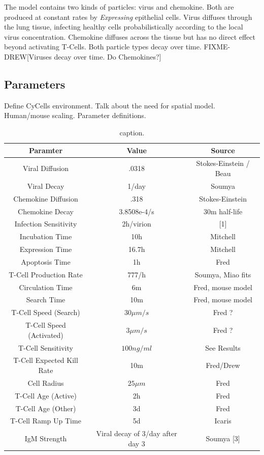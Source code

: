 \documentclass[10pt]{article}
\begin{document}
The model contains two kinds of particles: virus and chemokine. Both are produced at constant rates by \emph{Expressing} epithelial cells.
Virus diffuses through the lung tissue, infecting healthy cells probabilistically according to the local virus concentration. Chemokine diffuses across the tissue but has no
direct effect beyond activating T-Cells. Both particle types decay over time.
FIXME-DREW[Viruses decay over time. Do Chemokines?]

\subsection*{Parameters}

Define CyCells environment.  Talk about the need for spatial model.  Human/mouse scaling.  Parameter definitions. 

\begin{table}
\begin{tabular}{ | c | c | c | }
  \hline                        
  Paramter & Value & Source \\
  \hline
  Viral Diffusion & .0318 & Stokes-Einstein / Beau \\
  Viral Decay &  1/day & Soumya \\
  Chemokine Diffusion & .318 & Stokes-Einstein \\
  Chemokine Decay &  3.8508e-4/s & 30m half-life \\
  Infection Sensitivity &  2h/virion & [1] \\
  Incubation Time &  10h & Mitchell \\
  Expression Time &  16.7h & Mitchell \\
  Apoptosis Time & 1h & Fred \\
  T-Cell Production Rate & 777/h & Soumya, Miao fits \\ 
  Circulation Time & 6m & Fred, mouse model \\
  Search Time & 10m & Fred, mouse model \\
  T-Cell Speed (Search) & $30 \mu m/s$ & Fred ? \\
  T-Cell Speed (Activated) & $3 \mu m/s$ & Fred ?\\
  T-Cell Sensitivity & $100 ng/ml$ & See Results \\
  T-Cell Expected Kill Rate & 10m & Fred/Drew \\
  Cell Radius & $25 \mu m$ & Fred \\
  T-Cell Age (Active) & 2h & Fred \\
  T-Cell Age (Other) & 3d & Fred \\
  T-Cell Ramp Up Time & 5d & Icaris \\
  IgM Strength & Viral decay of 3/day after day 3 & Soumya [3] \\
  \hline  
\end{tabular}
\caption{caption.}
\label{table:parameters}
\end{table}
\end{document}
